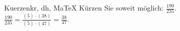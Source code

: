 \begin{MAufgabe}{Kuerzen}{kr, dh, MaTeX}
K\"urzen Sie soweit m\"oglich: $\frac{190}{235}$.\\ 
\ifLsg\MLoesung
\quad $\frac{190}{235}=\frac{(5)\cdot(38)}{(5)\cdot(47)}=\frac{38}{47}$.\else\relax\fi
 \end{MAufgabe}
